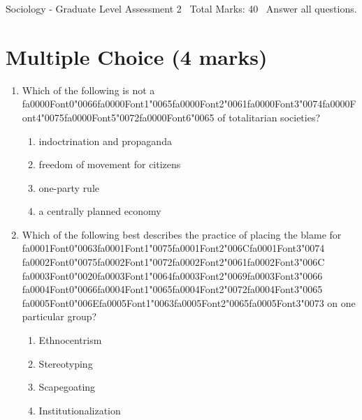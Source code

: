 \documentclass[12pt]{article}
\begin{document}
\begin{center}
Sociology - Graduate Level Assessment 2 \
Total Marks: 40 \
Answer all questions.
\end{center}

\section*{Multiple Choice (4 marks)}
\begin{enumerate}[label=\arabic*.]
\item Which of the following is not a {\csname fa0000Font0\endcsname\char"0066}{\csname fa0000Font1\endcsname\char"0065}{\csname fa0000Font2\endcsname\char"0061}{\csname fa0000Font3\endcsname\char"0074}{\csname fa0000Font4\endcsname\char"0075}{\csname fa0000Font5\endcsname\char"0072}{\csname fa0000Font6\endcsname\char"0065} of totalitarian societies?
\begin{enumerate}[label=(\alph*)]
    \item indoctrination and propaganda
    \item freedom of movement for citizens
    \item one-party rule
    \item a centrally planned economy
\end{enumerate}
\item Which of the following best describes the practice of placing the blame for {\csname fa0001Font0\endcsname\char"0063}{\csname fa0001Font1\endcsname\char"0075}{\csname fa0001Font2\endcsname\char"006C}{\csname fa0001Font3\endcsname\char"0074} {\csname fa0002Font0\endcsname\char"0075}{\csname fa0002Font1\endcsname\char"0072}{\csname fa0002Font2\endcsname\char"0061}{\csname fa0002Font3\endcsname\char"006C} {\csname fa0003Font0\endcsname\char"0020}{\csname fa0003Font1\endcsname\char"0064}{\csname fa0003Font2\endcsname\char"0069}{\csname fa0003Font3\endcsname\char"0066} {\csname fa0004Font0\endcsname\char"0066}{\csname fa0004Font1\endcsname\char"0065}{\csname fa0004Font2\endcsname\char"0072}{\csname fa0004Font3\endcsname\char"0065} {\csname fa0005Font0\endcsname\char"006E}{\csname fa0005Font1\endcsname\char"0063}{\csname fa0005Font2\endcsname\char"0065}{\csname fa0005Font3\endcsname\char"0073} on one particular group?
\begin{enumerate}[label=(\alph*)]
    \item Ethnocentrism
    \item Stereotyping
    \item Scapegoating
    \item Institutionalization
\end{enumerate}
\end{enumerate}
\end{document}

